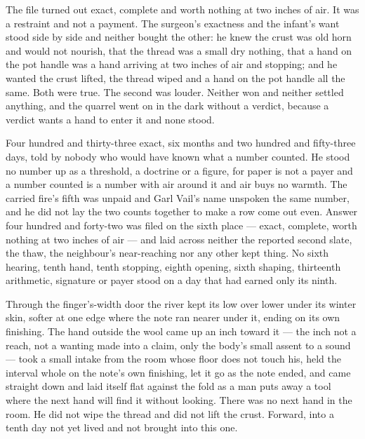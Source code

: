 The file turned out exact, complete and worth nothing at two inches of air. It was a restraint and not a payment. The surgeon's exactness and the infant's want stood side by side and neither bought the other: he knew the crust was old horn and would not nourish, that the thread was a small dry nothing, that a hand on the pot handle was a hand arriving at two inches of air and stopping; and he wanted the crust lifted, the thread wiped and a hand on the pot handle all the same. Both were true. The second was louder. Neither won and neither settled anything, and the quarrel went on in the dark without a verdict, because a verdict wants a hand to enter it and none stood.

Four hundred and thirty-three exact, six months and two hundred and fifty-three days, told by nobody who would have known what a number counted. He stood no number up as a threshold, a doctrine or a figure, for paper is not a payer and a number counted is a number with air around it and air buys no warmth. The carried fire's fifth was unpaid and Garl Vail's name unspoken the same number, and he did not lay the two counts together to make a row come out even. Answer four hundred and forty-two was filed on the sixth place --- exact, complete, worth nothing at two inches of air --- and laid across neither the reported second slate, the thaw, the neighbour's near-reaching nor any other kept thing. No sixth hearing, tenth hand, tenth stopping, eighth opening, sixth shaping, thirteenth arithmetic, signature or payer stood on a day that had earned only its ninth.

Through the finger's-width door the river kept its low over lower under its winter skin, softer at one edge where the note ran nearer under it, ending on its own finishing. The hand outside the wool came up an inch toward it --- the inch not a reach, not a wanting made into a claim, only the body's small assent to a sound --- took a small intake from the room whose floor does not touch his, held the interval whole on the note's own finishing, let it go as the note ended, and came straight down and laid itself flat against the fold as a man puts away a tool where the next hand will find it without looking. There was no next hand in the room. He did not wipe the thread and did not lift the crust. Forward, into a tenth day not yet lived and not brought into this one.
